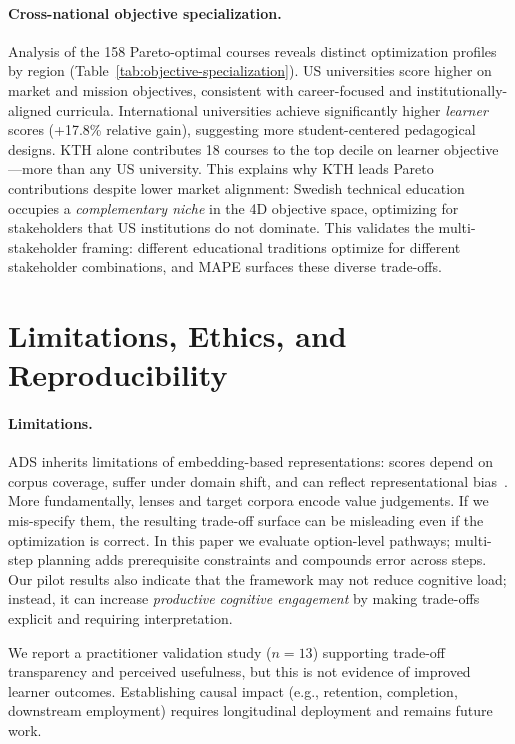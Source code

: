 \documentclass[sigconf,review]{acmart}
\newcommand{\ADS}{\textsc{ADS}\xspace}
\newcommand{\MAPE}{\textsc{MAPE}\xspace}
\begin{document}


\paragraph{Cross-national objective specialization.}
Analysis of the 158 Pareto-optimal courses reveals distinct optimization profiles by region (Table~\ref{tab:objective-specialization}). US universities score higher on market and mission objectives, consistent with career-focused and institutionally-aligned curricula. International universities achieve significantly higher \emph{learner} scores (+17.8\% relative gain), suggesting more student-centered pedagogical designs. KTH alone contributes 18 courses to the top decile on learner objective---more than any US university. This explains why KTH leads Pareto contributions despite lower market alignment: Swedish technical education occupies a \emph{complementary niche} in the 4D objective space, optimizing for stakeholders that US institutions do not dominate. This validates the multi-stakeholder framing: different educational traditions optimize for different stakeholder combinations, and \MAPE surfaces these diverse trade-offs.




\section{Limitations, Ethics, and Reproducibility}
\label{sec:ethics}

\paragraph{Limitations.}
\ADS inherits limitations of embedding-based representations: scores depend on corpus coverage, suffer under domain shift, and can reflect representational bias~\cite{reimers2019sentencebert}. More fundamentally, lenses and target corpora encode value judgements. If we mis-specify them, the resulting trade-off surface can be misleading even if the optimization is correct. In this paper we evaluate option-level pathways; multi-step planning adds prerequisite constraints and compounds error across steps. Our pilot results also indicate that the framework may not reduce cognitive load; instead, it can increase \emph{productive cognitive engagement} by making trade-offs explicit and requiring interpretation.

We report a practitioner validation study ($n{=}13$) supporting trade-off transparency and perceived usefulness, but this is not evidence of improved learner outcomes. Establishing causal impact (e.g., retention, completion, downstream employment) requires longitudinal deployment and remains future work.
\end{document}
